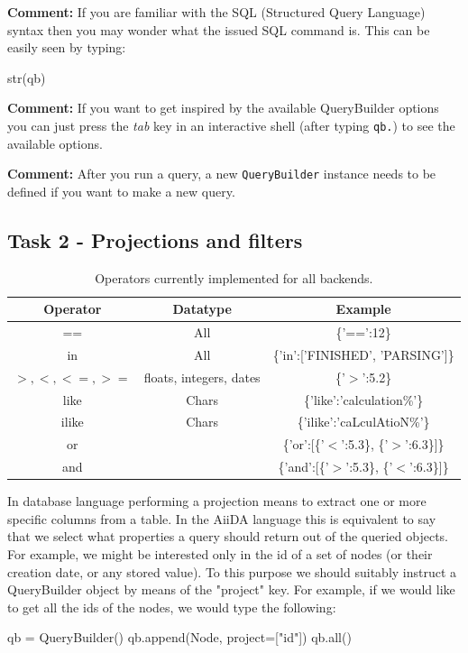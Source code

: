 \textbf{Comment:} If you are familiar with the SQL (Structured Query Language) syntax then you may wonder what the issued SQL command is.
This can be easily seen by typing:
\begin{pythoncommand}
str(qb)
\end{pythoncommand}

\textbf{Comment:}
If you want to get inspired by the available QueryBuilder options you can just press the
\emph{tab} key in an interactive shell (after typing \texttt{qb.}) to see the available options.

\textbf{Comment:} After you run a query, a new \texttt{QueryBuilder} instance
needs to be defined if you want to make a new query.

\subsection*{Task 2 - Projections and filters}

\begin{table}[h]
\begin{center}

\begin{tabular}{ccc} \hline
Operator & Datatype & Example \\ \hline
== & All & \{'==':12\}  \\
in & All & \{'in':['FINISHED', 'PARSING']\} \\ \hline
$>,<,<=,>=$ & floats, integers, dates & \{'$>$':5.2\} \\ \hline
like & Chars & \{'like':'calculation\%'\} \\
ilike & Chars & \{'ilike':'caLculAtioN\%'\} \\ \hline
or & & \{'or':[\{'$<$':5.3\}, \{'$>$':6.3\}]\} \\
and & &  \{'and':[\{'$>$':5.3\}, \{'$<$':6.3\}]\} \\
\hline
\end{tabular}
\end{center}
\caption{Operators currently implemented for all backends.}
\label{tab.filterops}
\end{table}

In database language performing a projection means to extract one or more specific columns from a table. In the AiiDA language this is equivalent to say that we select what properties a query should return out of the queried objects.
For example, we might be interested only in the id of a set of nodes (or their creation date, or any stored value).
To this purpose we should suitably instruct a QueryBuilder object by means of the "project" key.
For example, if we would like to get all the ids of the nodes, we would type the following:
\begin{pythoncommand}
qb = QueryBuilder()
qb.append(Node, project=["id"])
qb.all()
\end{pythoncommand}

